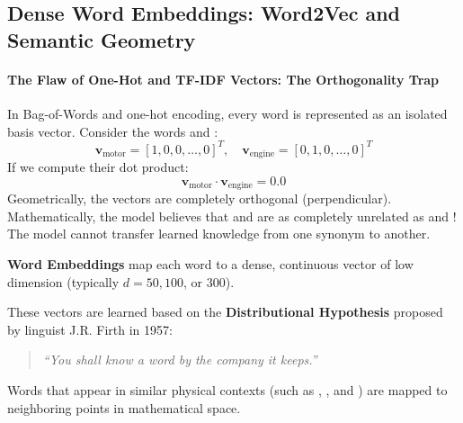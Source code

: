 \subsection{Dense Word Embeddings: Word2Vec and Semantic Geometry}\label{subsec:word_embeddings}

\paragraph{The Flaw of One-Hot and TF-IDF Vectors: The Orthogonality Trap}
In Bag-of-Words and one-hot encoding, every word is represented as an isolated basis vector. 
Consider the words  and :
\begin{equation*}
\mathbf{v}_{\text{motor}} = [1, 0, 0, \dots, 0]^T, \quad \mathbf{v}_{\text{engine}} = [0, 1, 0, \dots, 0]^T
\end{equation*}
If we compute their dot product:
\begin{equation*}
\mathbf{v}_{\text{motor}} \cdot \mathbf{v}_{\text{engine}} = 0.0
\end{equation*}
Geometrically, the vectors are completely orthogonal (perpendicular). Mathematically, the model believes that  and  are as completely unrelated as  and ! The model cannot transfer learned knowledge from one synonym to another.

\begin{keyidea}
\textbf{Word Embeddings} map each word to a dense, continuous vector of low dimension (typically $d = 50, 100$, or $300$). 

These vectors are learned based on the \textbf{Distributional Hypothesis} proposed by linguist J.R. Firth in 1957:
\begin{quote}
\emph{``You shall know a word by the company it keeps.''}
\end{quote}
Words that appear in similar physical contexts (such as , , and ) are mapped to neighboring points in mathematical space.
\end{keyidea}

